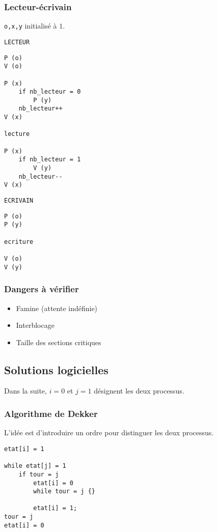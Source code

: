 \documentclass[9pt,a4paper,twocolumn]{article}
\begin{document}
    \subsubsection{Lecteur-\'ecrivain}

    \texttt{o,x,y} initialisé à $1$.

    \texttt{LECTEUR}
    \begin{lstlisting}[frame=shadowbox]
P (o)
V (o)

P (x)
    if nb_lecteur = 0
        P (y)
    nb_lecteur++
V (x)

lecture

P (x)
    if nb_lecteur = 1
        V (y)
    nb_lecteur--
V (x)
    \end{lstlisting}


    \texttt{ECRIVAIN}
    \begin{lstlisting}[frame=shadowbox]
P (o)
P (y)

ecriture

V (o)
V (y)
    \end{lstlisting}

    \subsubsection{Dangers à vérifier}

    \begin{itemize}
        \item Famine (attente indéfinie)
        \item Interblocage
        \item Taille des sections critiques
    \end{itemize}

    \subsection{Solutions logicielles}

    Dans la suite, $i=0$ et $j=1$ désignent les deux processus.

    \subsubsection{Algorithme de Dekker}

    L'idée est d'introduire un ordre pour distinguer les deux processus.
    \begin{lstlisting}[frame=shadowbox]
etat[i] = 1

while etat[j] = 1
    if tour = j
        etat[i] = 0
        while tour = j {}
        
        etat[i] = 1;
tour = j
etat[i] = 0
    \end{lstlisting}
\end{document}
